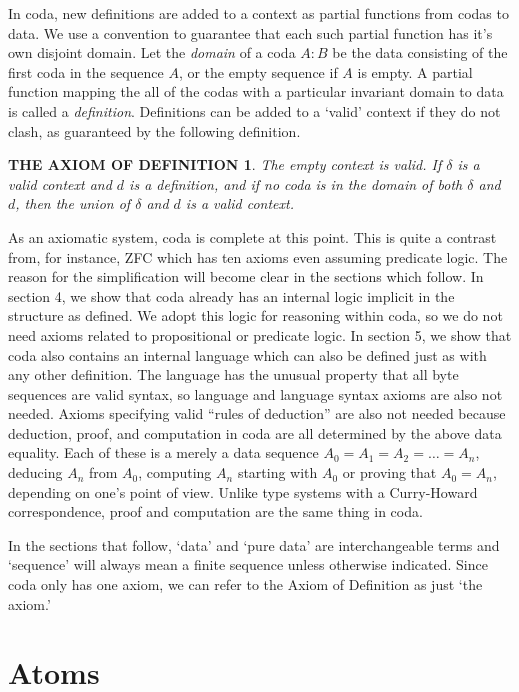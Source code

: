 \documentclass[11pt]{article}
\begin{document}
     In coda, new definitions are added to a context as partial functions from codas to data.  We use a convention to guarantee that each such partial
function has it's own disjoint domain.  Let the {\it domain} of a coda $A:B$ be the data consisting of the first coda in the sequence $A$, or the empty
sequence if $A$ is empty.  A partial function mapping the all of the codas with a particular invariant domain to data is called a {\it definition}.  Definitions
can be added to a `valid' context if they do not clash, as guaranteed by the following definition. 
\newtheorem*{remark}{THE AXIOM OF DEFINITION}
\begin{remark}  The empty context is valid.  If $\delta$ is a valid context and $d$ is a definition, and if no coda is in
the domain of both $\delta$ and $d$, then the union of $\delta$ and $d$ is a valid context.
\end{remark}
\noindent As an axiomatic system, coda is complete at this point.  This is quite a contrast from, for instance, ZFC which has ten axioms 
even assuming predicate logic.  The reason for the simplification will become clear in the sections which follow.  In section 4, we show 
that coda already has an internal logic implicit in the structure as defined.  We adopt this logic for reasoning within coda, so we do not 
need axioms related to propositional or predicate logic.  In section 5, we show that coda also contains an internal language which can 
also be defined just as with any other definition.  The language has the unusual property that all byte sequences are valid syntax, 
so language and language syntax axioms are also not needed.  Axioms specifying valid ``rules of deduction'' are also not needed 
because deduction, proof, and computation in coda are all determined by the above data equality.  Each of these is a merely a data sequence $A_0=A_1=A_2=\dots=A_n$, 
deducing $A_n$ from $A_0$, computing $A_n$ starting with $A_0$ or proving that $A_0=A_n$, depending on one's point of view.  
Unlike type systems with a Curry-Howard correspondence, proof and computation are the same thing in coda. 

In the sections that follow, 
`data' and `pure data' are interchangeable terms and `sequence' will always mean a finite sequence unless otherwise indicated.  Since coda 
only has one axiom, we can refer to the Axiom of Definition as just `the axiom.' 

\section{Atoms}
\end{document}
